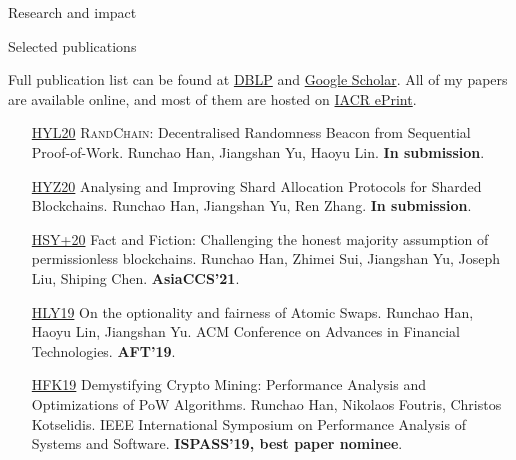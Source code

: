 \documentclass{resume} %
\begin{document}
\begin{rSection}{Research and impact}
\end{rSection}



\begin{rSection}{Selected publications}

    Full publication list can be found at \href{https://dblp.org/pers/hd/h/Han:Runchao}{DBLP} and \href{http://scholar.google.com/citations?user=xbpDocQAAAAJ&hl=en}{Google Scholar}.
    All of my papers are available online, and most of them are hosted on \href{https://eprint.iacr.org/}{IACR ePrint}.

    \begin{itemize}
        \item[\href{https://eprint.iacr.org/2020/1033}{HYL20}] \textsc{RandChain}: Decentralised Randomness Beacon from Sequential Proof-of-Work. Runchao Han, Jiangshan Yu, Haoyu Lin. \textbf{In submission}.
        \item[\href{https://eprint.iacr.org/2020/943}{HYZ20}] Analysing and Improving Shard Allocation Protocols for Sharded Blockchains. Runchao Han, Jiangshan Yu, Ren Zhang. \textbf{In submission}.
        \item[\href{https://eprint.iacr.org/2019/752}{HSY+20}] Fact and Fiction: Challenging the honest majority assumption of permissionless blockchains. Runchao Han, Zhimei Sui, Jiangshan Yu, Joseph Liu, Shiping Chen.  \textbf{AsiaCCS'21}.
        \item[\href{https://eprint.iacr.org/2019/896}{HLY19}] On the optionality and fairness of Atomic Swaps. Runchao Han, Haoyu Lin, Jiangshan Yu.  ACM Conference on Advances in Financial Technologies. \textbf{AFT'19}.
        \item[\href{https://www.research.manchester.ac.uk/portal/files/85753741/paper.pdf}{HFK19}] Demystifying Crypto Mining: Performance Analysis and Optimizations of PoW Algorithms. Runchao Han, Nikolaos Foutris, Christos Kotselidis. IEEE International Symposium on Performance Analysis of Systems and Software. \textbf{ISPASS'19, best paper nominee}.
    \end{itemize}

\end{rSection}
\end{document}
